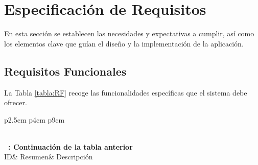 \section{Especificación de Requisitos}
En esta sección se establecen las necesidades y expectativas a cumplir, así como los elementos clave que guían el diseño y la implementación de la aplicación.

\subsection{Requisitos Funcionales}
La Tabla \ref{tabla:RF} recoge las funcionalidades específicas que el sistema debe ofrecer.

\begin{longtable}{ p{2.5cm} p{4cm} p{9cm}  }
    \caption{Requisitos  Funcionales} \label{tabla:RF} \\
    \hline
    \endfirsthead
    {{\bfseries \tablename\ \thetable{}: Continuación de la tabla anterior}} \\
    \hline
    ID& Resumen& Descripción \\
    \hline
    \endhead
    
    \hline {} \\ \hline
    \endfoot
    
    \hline
    \endlastfoot
    

\end{longtable}
